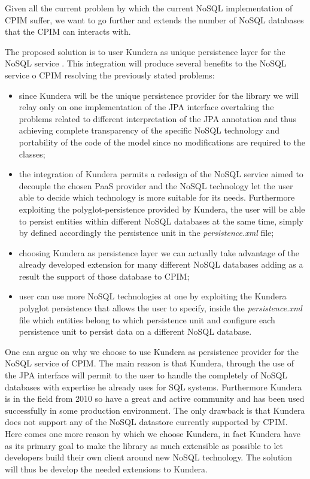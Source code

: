 \newparagraph Given all the current problem by which the current NoSQL implementation of CPIM suffer, we want to go further and extends the number of NoSQL databases that the CPIM can interacts with.

\noindent The proposed solution is to user Kundera as unique persistence layer for the NoSQL service . This integration will produce several benefits to the NoSQL service o CPIM resolving the previously stated problems:
\begin{itemize}
\item since Kundera will be the unique persistence provider for the library we will relay only on one implementation of the JPA interface overtaking the problems related to different interpretation of the JPA annotation and thus achieving complete transparency of the specific NoSQL technology and portability of the code of the model since no modifications are required to the classes;
\item the integration of Kundera permits a redesign of the NoSQL service aimed to decouple the chosen PaaS provider and the NoSQL technology let the user able to decide which technology is more suitable for its needs. Furthermore exploiting the polyglot-persistence provided by Kundera, the user will be able to persist entities within different NoSQL databases at the same time, simply by defined accordingly the persistence unit in the \textit{persistence.xml} file;
\item choosing Kundera as persistence layer we can actually take advantage of the already developed extension for many different NoSQL databases adding as a result the support of those database to CPIM;
\item user can use more NoSQL technologies at one by exploiting the Kundera polyglot persistence that allows the user to specify, inside the \textit{persistence.xml} file which entities belong to which persistence unit and configure each persistence unit to persist data on a different NoSQL database.
\end{itemize}

\noindent One can argue on why we choose to use Kundera as persistence provider for the NoSQL service of CPIM. The main reason is that Kundera, through the use of the JPA interface will permit to the user to handle the completely of NoSQL databases with expertise he already uses for SQL systems.
Furthermore Kundera is in the field from 2010 so have a great  and active community and has been used successfully in some production environment.
The only drawback is that Kundera does not support any of the NoSQL datastore currently supported by CPIM.
Here comes one more reason by which we choose Kundera, in fact Kundera have as its primary goal to make the library as much extensible as possible to let developers build their own client around new NoSQL technology. The solution will thus be develop the needed extensions to Kundera.

